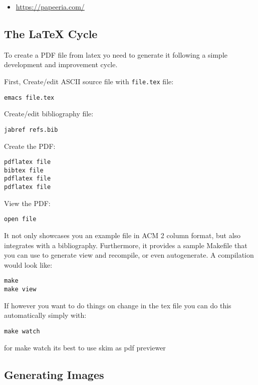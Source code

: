\begin{itemize}
\tightlist
\item
  \url{https://papeeria.com/}
\end{itemize}

\subsection{The LaTeX Cycle}\label{the-latex-cycle}

To create a PDF file from latex yo need to generate it following a
simple development and improvement cycle.

First, Create/edit ASCII source file with \texttt{file.tex} file:

\begin{verbatim}
emacs file.tex
\end{verbatim}

Create/edit bibliography file:

\begin{verbatim}
jabref refs.bib
\end{verbatim}

Create the PDF:

\begin{verbatim}
pdflatex file
bibtex file
pdflatex file
pdflatex file
\end{verbatim}

View the PDF:

\begin{verbatim}
open file
\end{verbatim}

It not only showcases you an example file in ACM 2 column format, but
also integrates with a bibliography. Furthermore, it provides a sample
Makefile that you can use to generate view and recompile, or even
autogenerate. A compilation would look like:

\begin{verbatim}
make
make view
\end{verbatim}

If however you want to do things on change in the tex file you can do
this automatically simply with:

\begin{verbatim}
make watch
\end{verbatim}

for make watch its best to use skim as pdf previewer

\subsection{Generating Images}\label{generating-images}

